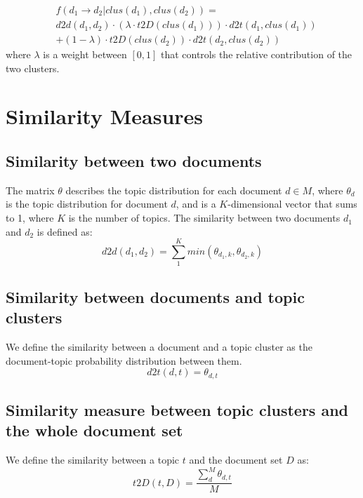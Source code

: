 \begin{align*}
&f(d_1 \rightarrow d_2 | clus(d_1), clus(d_2)) = \\
&d2d(d_1, d_2) \cdot (\lambda \cdot t2D(clus(d_1))) \cdot d2t(d_1, clus(d_1)) \\ 
&+ (1-\lambda) \cdot t2D(clus(d_2)) \cdot d2t(d_2, clus(d_2))
\end{align*}
where $\lambda$ is a weight between $[0,1]$ that controls the relative contribution of the two clusters.


\section{Similarity Measures}\label{sec:similarity}
\subsection{Similarity between two documents}
The matrix $\theta$ describes the topic distribution for each document $d \in M$, where $\theta_d$ is the topic distribution for document $d$, and is a $K$-dimensional vector that sums to 1, where $K$ is the number of topics.
The similarity between two documents $d_1$ and $d_2$ is defined as:
$$ d2d(d_1, d_2) = \sum_{1}^{K} min(\theta_{d_1,k}, \theta_{d_2,k})$$

\subsection{Similarity between documents and topic clusters}
We define the similarity between a document and a topic cluster as the document-topic probability distribution between them.
$$ d2t(d,t) = \theta_{d,t}$$

\subsection{Similarity measure between topic clusters and the whole document set}
We define the similarity between a topic $t$ and the document set $D$ as:
$$ t2D(t, D) = \frac{\sum_{d}^{M} \theta_{d,t}}{M} $$

